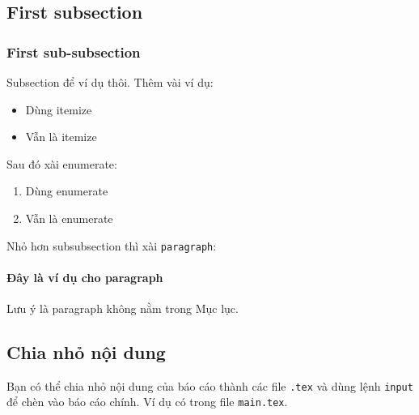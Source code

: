 \subsection{First subsection}
\subsubsection{First sub-subsection}
Subsection để ví dụ thôi. Thêm vài ví dụ:
\begin{itemize}
	\item Dùng itemize
	\item Vẫn là itemize
\end{itemize}
Sau đó xài enumerate:
\begin{enumerate}
	\item Dùng enumerate
	\item Vẫn là enumerate
\end{enumerate}
Nhỏ hơn subsubsection thì xài \texttt{paragraph}:

\paragraph{Đây là ví dụ cho paragraph}
Lưu ý là paragraph không nằm trong Mục lục.

\subsection{Chia nhỏ nội dung}
Bạn có thể chia nhỏ nội dung của báo cáo thành các file \texttt{.tex} và dùng lệnh \texttt{input} để chèn vào báo cáo chính. Ví dụ có trong file \texttt{main.tex}.
